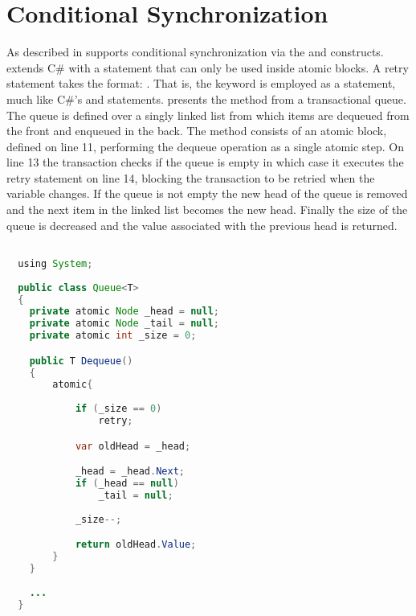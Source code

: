 \section{Conditional Synchronization}\label{sec:sync_design}
As described in  \stmnamesp supports conditional synchronization via the  and  constructs. \stmnamesp extends C\# with a  statement that can only be used inside atomic blocks. A retry statement takes the format: . That is, the keyword is employed as a statement, much like C\#'s  and  statements\cite[p. 102]{sestoft2011c}.  presents the  method from a transactional queue. The queue is defined over a singly linked list from which items are dequeued from the front and enqueued in the back. The  method consists of an atomic block, defined on line 11, performing the dequeue operation as a single atomic step. On line 13 the transaction checks if the queue is empty in which case it executes the retry statement on line 14, blocking the transaction to be retried when the  variable changes. If the queue is not empty the new head of the queue is removed and the next item in the linked list becomes the new head. Finally the size of the queue is decreased and the value associated with the previous head is returned. 

\begin{lstlisting}[label=lst:stm_atomic_syntax_retry,
  caption={Retry Syntax},
  language=Java,  
  showspaces=false,
  showtabs=false,
  breaklines=true,
  showstringspaces=false,
  breakatwhitespace=true,
  commentstyle=\color{greencomments},
  keywordstyle=\color{bluekeywords},
  stringstyle=\color{redstrings},
  morekeywords={atomic, retry, orElse, var, get, set, using}]  % Start your code-block

  using System;
  
  public class Queue<T>
  {
  	private atomic Node _head = null;
  	private atomic Node _tail = null;
  	private atomic int _size = 0;

  	public T Dequeue()
  	{
  		atomic{
  		
  			if (_size == 0)
  				retry;

  			var oldHead = _head;

  			_head = _head.Next;
  			if (_head == null)
  				_tail = null;
  			
  			_size--;

  			return oldHead.Value;
  		}
  	}
  	
  	...
  }
\end{lstlisting}

